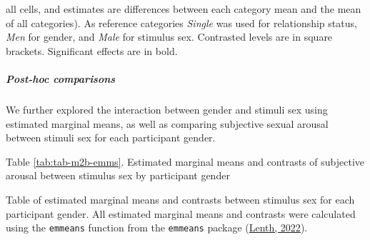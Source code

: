 \documentclass[
  bookmarksnumbered]{article}
\begin{document}
\begin{table}[H]
{\begin{threeparttable}
\begin{tablenotes}[para]
                              all cells, and estimates are differences between each category
                              mean and the mean of all categories).
                              As reference categories 
                              \textit{Single} was used for relationship status,
                              \textit{Men} for gender,
                              and \textit{Male} for stimulus sex. 
                              Contrasted levels are in square brackets. 
                              Significant effects are in bold.
\end{tablenotes}
\end{threeparttable}}
\end{table}

\hypertarget{post-hoc-comparisons-2}{%
\subparagraph{\texorpdfstring{\emph{Post-hoc} comparisons}{Post-hoc comparisons}}\label{post-hoc-comparisons-2}}

We further explored the interaction between gender and stimuli sex using estimated marginal means,
as well as comparing subjective sexual arousal between stimuli sex for each participant gender.

Table \ref{tab:tab-m2b-emms}. Estimated marginal means and contrasts of subjective arousal between stimulus sex by participant gender

Table of estimated marginal means and contrasts between stimulus sex for each participant gender. All estimated marginal means and contrasts were calculated using the \texttt{emmeans} function from the \texttt{emmeans} package (\protect\hyperlink{ref-emmeanscit}{Lenth, 2022}).
\end{document}
